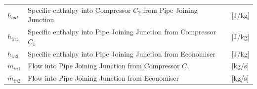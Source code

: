 \begin{center}
	\begin{tabular}{l p{10cm} l}
		$h_{out}$ 	& Specific enthalpy into Compressor $ C_2 $ from Pipe Joining Junction 		& [\si{J}/\si{kg}]\\ 
		$h_{in1}$ 	& Specific enthalpy into Pipe Joining Junction from Compressor $ C_1 $  		& [\si{J}/\si{kg}]\\ 
		$h_{in2}$ 	& Specific enthalpy into Pipe Joining Junction from Economiser   			& [\si{J}/\si{kg}]\\ 
		$\dot{m}_{in1}$ & Flow into Pipe Joining Junction from Compressor $ C_1 $ 		& [\si{kg}/\si{s}]\\
		$\dot{m}_{in2}$ & Flow into Pipe Joining Junction from Economiser 				& [\si{kg}/\si{s}]\\
	\end{tabular}
\end{center}



